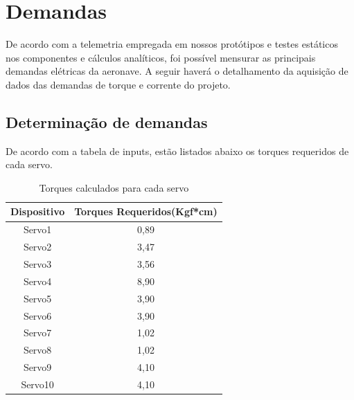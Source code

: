 \chapter{Demandas}\label{demandas.cap}

De acordo com a telemetria empregada em nossos protótipos e testes estáticos nos
componentes e cálculos analíticos, foi possível mensurar as principais demandas elétricas da
aeronave. A seguir haverá o detalhamento da aquisição de dados das demandas de torque e
corrente do projeto.

\section{Determinação de demandas}

De acordo com a tabela de inputs, estão listados abaixo os torques requeridos de cada
servo.

\begin{table}[h]
\centering
\caption{Torques calculados para cada servo}
\label{tab:torque_requerido}
\begin{tabular}{|c|c|}
\hline
\multicolumn{1}{|l|}{\textbf{Dispositivo}} & \multicolumn{1}{l|}{\textbf{Torques Requeridos(Kgf*cm)}} \\ \hline
Servo1                                     & 0,89                                                     \\ \hline
Servo2                                     & 3,47                                                     \\ \hline
Servo3                                     & 3,56                                                     \\ \hline
Servo4                                     & 8,90                                                     \\ \hline
Servo5                                     & 3,90                                                     \\ \hline
Servo6                                     & 3,90                                                     \\ \hline
Servo7                                     & 1,02                                                     \\ \hline
Servo8                                     & 1,02                                                     \\ \hline
Servo9                                     & 4,10                                                     \\ \hline
Servo10                                    & 4,10                                                     \\ \hline
\end{tabular}
\end{table}

